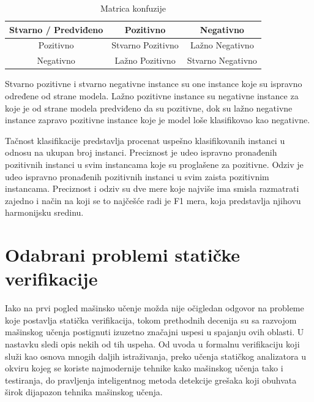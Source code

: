 \documentclass[a4paper]{article}
\theoremstyle{definition}
\begin{document}
{\begin{table}[h]
	\centering
	\begin{tabular}{ |c|cc| } 
		\hline
		Stvarno / Predviđeno & Pozitivno & Negativno \\ 
		\hline
		Pozitivno & Stvarno Pozitivno & Lažno Negativno \\ 
		Negativno & Lažno Pozitivno & Stvarno Negativno \\ 
		\hline
	\end{tabular}
	\caption{Matrica konfuzije}
	\label{table:matrica_konfuzije}
\end{table}

\par Stvarno pozitivne i stvarno negativne instance su one instance koje su ispravno određene od strane modela. Lažno pozitivne instance su negativne instance za koje je od strane modela predviđeno da su pozitivne, dok su lažno negativne instance zapravo pozitivne instance koje je model loše klasifikovao kao negativne. 

\par Tačnost klasifikacije predstavlja procenat uspešno klasifikovanih instanci u odnosu na ukupan broj instanci. Preciznost je udeo ispravno pronađenih pozitivnih instanci u svim instancama koje su proglašene za pozitivne. Odziv je udeo ispravno pronađenih pozitivnih instanci u svim zaista pozitivnim instancama. Preciznost i odziv su dve mere koje najviše ima smisla razmatrati zajedno i način na koji se to najčešće radi je F1 mera, koja predstavlja njihovu harmonijsku sredinu.

\section{Odabrani problemi statičke verifikacije}
\label{sec:naslovN}

\par Iako na prvi pogled mašinsko učenje možda nije očigledan odgovor na probleme koje postavlja statička verifikacija, tokom prethodnih decenija su sa razvojom mašinskog učenja postignuti izuzetno značajni uspesi u spajanju ovih oblasti. U nastavku sledi opis nekih od tih uspeha. Od uvoda u formalnu verifikaciju koji služi kao osnova mnogih daljih istraživanja, preko učenja statičkog analizatora u okviru kojeg se koriste najmodernije tehnike kako mašinskog učenja tako i testiranja, do pravljenja inteligentnog metoda detekcije grešaka koji obuhvata širok dijapazon tehnika mašinskog učenja.

}
\end{document}
